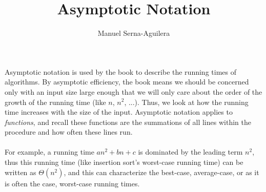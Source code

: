 \documentclass{article}
\title{Asymptotic Notation}
\author{Manuel Serna-Aguilera}
\date{}
\begin{document}
\maketitle
Asymptotic notation is used by the book to describe the running times of algorithms. By asymptotic efficiency, the book means we should be concerned only with an input size large enough that we will only care about the order of the growth of the running time (like $n$, $n^2$, ...). Thus, we look at how the running time increases with the size of the input. Asymptotic notation applies to \textit{functions}, and recall these functions are the summations of all lines within the procedure and how often these lines run. 
\\ \\
For example, a running time $an^2 + bn + c$ is dominated by the leading term $n^2$, thus this running time (like insertion sort's worst-case running time) can be written as $\Theta{(n^2)}$, and this can characterize the best-case, average-case, or as it is often the case, worst-case running times.
\end{document}
